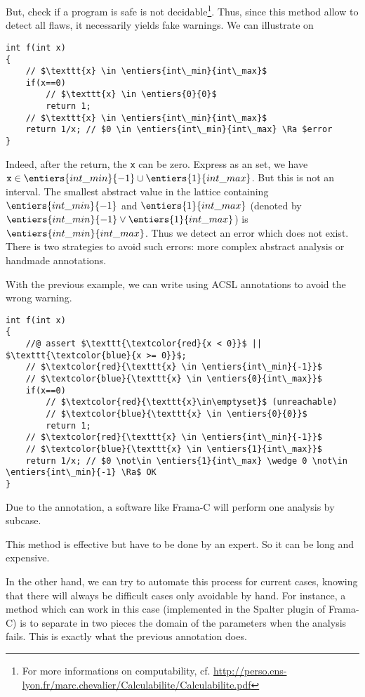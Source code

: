 \documentclass[a4paper, twoside, 10pt]{article}
\begin{document}
But, check if a program is safe is not decidable\footnote{For more informations on computability, cf. \url{http://perso.ens-lyon.fr/marc.chevalier/Calculabilite/Calculabilite.pdf}}. Thus, since this method allow to detect all flaws, it necessarily yields fake warnings. We can illustrate on
\begin{verbatim}
int f(int x)
{
    // $\texttt{x} \in \entiers{int\_min}{int\_max}$
    if(x==0)
        // $\texttt{x} \in \entiers{0}{0}$
        return 1;
    // $\texttt{x} \in \entiers{int\_min}{int\_max}$
    return 1/x; // $0 \in \entiers{int\_min}{int\_max} \Ra $error
}
\end{verbatim}
Indeed, after the return, the \texttt{x} can be zero. Express as an set, we have $\texttt{x} \in \entiers{int\_min}{-1} \cup \entiers{1}{int\_max}$. But this is not an interval. The smallest abstract value in the lattice  containing $\entiers{int\_min}{-1}$ and $\entiers{1}{int\_max}$ (denoted by $\entiers{int\_min}{-1} \vee \entiers{1}{int\_max}$) is $\entiers{int\_min}{int\_max}$. Thus we detect an error which does not exist. There is two strategies to avoid such errors: more complex abstract analysis or handmade annotations.

With the previous example, we can write  using ACSL annotations to avoid the wrong warning.
\begin{verbatim}
int f(int x)
{
    //@ assert $\texttt{\textcolor{red}{x < 0}}$ || $\texttt{\textcolor{blue}{x >= 0}}$;
    // $\textcolor{red}{\texttt{x} \in \entiers{int\_min}{-1}}$
    // $\textcolor{blue}{\texttt{x} \in \entiers{0}{int\_max}}$
    if(x==0)
        // $\textcolor{red}{\texttt{x}\in\emptyset}$ (unreachable)
        // $\textcolor{blue}{\texttt{x} \in \entiers{0}{0}}$
        return 1;
    // $\textcolor{red}{\texttt{x} \in \entiers{int\_min}{-1}}$
    // $\textcolor{blue}{\texttt{x} \in \entiers{1}{int\_max}}$
    return 1/x; // $0 \not\in \entiers{1}{int\_max} \wedge 0 \not\in \entiers{int\_min}{-1} \Ra$ OK
}
\end{verbatim}
Due to the annotation, a software like Frama-C will perform one analysis by subcase.

\bigskip

This method is effective but have to be done by an expert. So it can be long and expensive.

In the other hand, we can try to automate this process for current cases, knowing that there will always be difficult cases only avoidable by hand. For instance, a method which can work in this case (implemented in the Spalter plugin of Frama-C) is to separate in two pieces the domain of the parameters when the analysis fails. This is exactly what the previous annotation does. 
\end{document}
